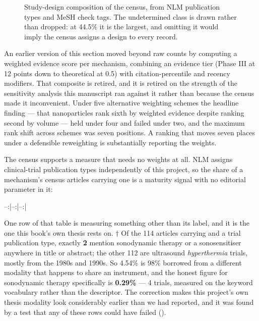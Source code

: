 \documentclass[11pt,twoside,openright]{report}
\begin{document}
\begin{figure}[tbp]
\setcounter{figure}{9}
\caption{Study-design composition of the census, from NLM publication types and MeSH check tags. The undetermined class is drawn rather than dropped: at 44.5\% it is the largest, and omitting it would imply the census assigns a design to every record.}
\label{fig:fig9c_design_composition}
\end{figure}

An earlier version of this section moved beyond raw counts by computing a weighted evidence score per mechanism, combining an evidence tier (Phase III at 12 points down to theoretical at 0.5) with citation-percentile and recency modifiers. That composite is retired, and it is retired on the strength of the sensitivity analysis this manuscript ran against it rather than because the census made it inconvenient. Under five alternative weighting schemes the headline finding --- that nanoparticles rank sixth by weighted evidence despite ranking second by volume --- held under four and failed under two, and the maximum rank shift across schemes was seven positions. A ranking that moves seven places under a defensible reweighting is substantially reporting the weights.

The census supports a measure that needs no weights at all. NLM assigns clinical-trial publication types independently of this project, so the share of a mechanism's census articles carrying one is a maturity signal with no editorial parameter in it:


--:|--:|--:|














One row of that table is measuring something other than its label, and it is the one this book's own thesis rests on. $\dagger$ Of the 114 articles carrying  and a trial publication type, exactly \textbf{2} mention sonodynamic therapy or a sonosensitiser anywhere in title or abstract; the other 112 are ultrasound \textit{hyperthermia} trials, mostly from the 1980s and 1990s. So 4.54\% is 98\% borrowed from a different modality that happens to share an instrument, and the honest figure for sonodynamic therapy specifically is \textbf{0.29\%} --- 4 trials, measured on the keyword vocabulary rather than the descriptor. The correction makes this project's own thesis modality look considerably earlier than we had reported, and it was found by a test that any of these rows could have failed ().
\end{document}
